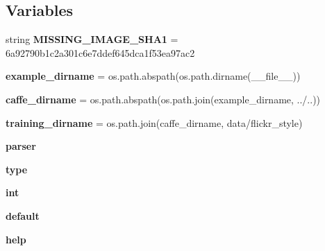 \subsection*{Variables}
\begin{DoxyCompactItemize}
\item 
\mbox{\label{namespaceassemble__data_a0b79c574760a55664c73cb48c078d9ae}} 
string {\bfseries M\+I\+S\+S\+I\+N\+G\+\_\+\+I\+M\+A\+G\+E\+\_\+\+S\+H\+A1} = \textquotesingle{}6a92790b1c2a301c6e7ddef645dca1f53ea97ac2\textquotesingle{}
\item 
\mbox{\label{namespaceassemble__data_a1eaa1b583a232b9a72fea879bbc1b569}} 
{\bfseries example\+\_\+dirname} = os.\+path.\+abspath(os.\+path.\+dirname(\+\_\+\+\_\+file\+\_\+\+\_\+))
\item 
\mbox{\label{namespaceassemble__data_ae884a5ec30f0ea8674d2e768ac6bc08e}} 
{\bfseries caffe\+\_\+dirname} = os.\+path.\+abspath(os.\+path.\+join(example\+\_\+dirname, \textquotesingle{}../..\textquotesingle{}))
\item 
\mbox{\label{namespaceassemble__data_a4ea05cb0f6a6d66e0ce5ab6db605095a}} 
{\bfseries training\+\_\+dirname} = os.\+path.\+join(caffe\+\_\+dirname, \textquotesingle{}data/flickr\+\_\+style\textquotesingle{})
\item 
{\bfseries parser}
\item 
\mbox{\label{namespaceassemble__data_a09e6ee1d6cd68b0f391c3ec27cdee435}} 
{\bfseries type}
\item 
\mbox{\label{namespaceassemble__data_a0c992fe09795e66e40de9d74971bccf7}} 
{\bfseries int}
\item 
\mbox{\label{namespaceassemble__data_a1052a9fce4b4b025be99057ced31073d}} 
{\bfseries default}
\item 
\mbox{\label{namespaceassemble__data_a061452d16e584b24cb92862900b106dd}} 
{\bfseries help}
\item 
\mbox{\label{namespaceassemble__data_a616f9d922977d382ee30365256035f99}} 

\end{DoxyCompactItemize}
